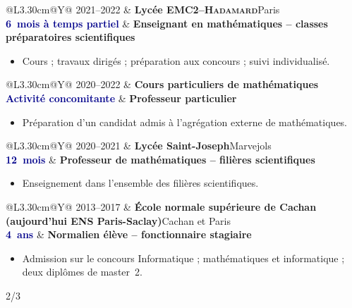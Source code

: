 \documentclass[10pt,a4paper]{article}
\makeatletter
\newcommand{\ensparissaclay}{ENS Paris-Saclay}
\newcommand{\cventry}[5]{%
  \begin{tabularx}{\textwidth}{@{}L{3.30cm}@{\hspace{0.22cm}}Y@{}}
    \textcolor{softgray}{#1} & \textbf{#3}\hfill\textcolor{softgray}{#4}\\[-0.10ex]
    \small\textcolor{darkblue}{\textbf{#2}} & \textbf{#5}
  \end{tabularx}\vspace{-0.22em}
}
\newcommand{\pageheader}[1]{%
  \hfill{\small\color{softgray}#1/3}\par
  \vspace{-0.78em}
}
\makeatother
\begin{document}
\cventry{2021--2022}{6~mois à temps partiel}{Lycée EMC2--\textsc{Hadamard}}{Paris}{Enseignant en mathématiques -- classes préparatoires scientifiques}
\begin{itemize}
  \item Cours ; travaux dirigés ; préparation aux concours ; suivi individualisé.
\end{itemize}

\cventry{2020--2022}{Activité concomitante}{Cours particuliers de mathématiques}{}{Professeur particulier}
\begin{itemize}
  \item Préparation d'un candidat admis à l'agrégation externe de mathématiques.
\end{itemize}
\cventry{2020--2021}{12~mois}{Lycée Saint-Joseph}{Marvejols}{Professeur de mathématiques -- filières scientifiques}
\begin{itemize}
  \item Enseignement dans l'ensemble des filières scientifiques.
\end{itemize}
\cventry{2013--2017}{4~ans}{École normale supérieure de Cachan (aujourd'hui \ensparissaclay)}{Cachan et Paris}{Normalien élève -- fonctionnaire stagiaire}
\begin{itemize}
  \item Admission sur le concours Informatique ; mathématiques et informatique ;
  deux diplômes de master~2.
\end{itemize}

\newpage

\pageheader{2}
\enlargethispage{1.5\baselineskip}

\end{document}
